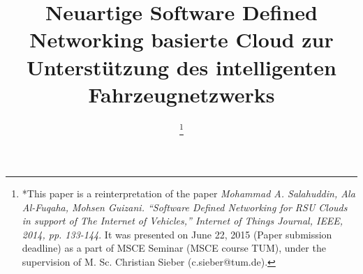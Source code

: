 \documentclass[conference]{IEEEtran}
\begin{document}
%
\title{Neuartige Software Defined Networking basierte Cloud zur Unterstützung des intelligenten Fahrzeugnetzwerks}
%


\author{

\thanks{*This paper is a reinterpretation of the paper \emph{Mohammad A. Salahuddin, Ala Al-Fuqaha, Mohsen Guizani. ``Software Defined Networking for RSU Clouds in support of The Internet of Vehicles,'' Internet of Things Journal, IEEE, 2014, pp. 133-144}. It was presented on June 22, 2015 (Paper submission deadline) as a part of MSCE Seminar (MSCE course TUM), under the supervision of M. Sc. 
Christian Sieber (c.sieber@tum.de).}
}


% 
\end{document}
